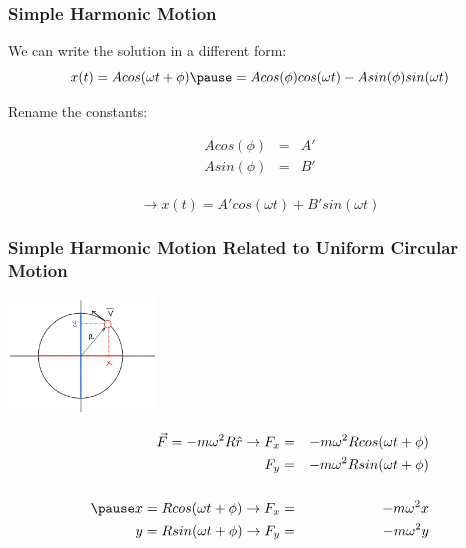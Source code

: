 \documentclass[]{beamer}
\begin{document}
\begin{frame}
\frametitle{Simple Harmonic Motion}

We can write the solution in a different form:
\pause
\begin{equation*}
x(t)=A cos(\omega t +\phi)\pause = A cos (\phi)cos(\omega t)-A sin (\phi)sin(\omega t)
\end{equation*}
\pause

\textcolor{mypink1}{Rename the constants:}
\pause


\begin{eqnarray*}
Acos(\phi)&=&A'\\
Asin(\phi)&=&B'\\
\end{eqnarray*}

\pause

\begin{equation*}
\rightarrow x(t)=A' cos(\omega t)+B' sin(\omega t)
\end{equation*}

  \end{frame}


\begin{frame}
\frametitle{Simple Harmonic Motion Related
to Uniform Circular Motion}

    \begin{center}
  \includegraphics[height=1.2in]{images3/circular.jpg}
\end{center}


\begin{eqnarray*}
\vec{F}=-m\omega^2R\hat{r} \rightarrow F_x&=&-m\omega^2Rcos(\omega t +\phi)\\
F_y&=&-m\omega^2Rsin(\omega t +\phi)\\
\\
\pause
x=Rcos(\omega t +\phi) \rightarrow F_x&=&-m\omega^2x\\
y=Rsin(\omega t +\phi)  \rightarrow F_y&=&-m\omega^2y
\end{eqnarray*}


  \end{frame}
\end{document}
